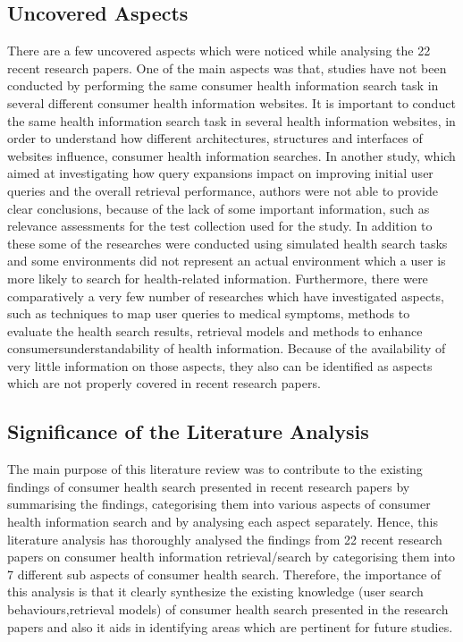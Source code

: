 \documentclass[]{article}
\begin{document}
\subsection{Uncovered Aspects} 

There are a few uncovered aspects which were noticed while analysing the 22 recent research papers. One of the main aspects was that, studies have not been conducted by performing the same consumer health information search task in several different consumer health information websites. It is important to conduct the same health information search task in several health information websites, in order to understand how different architectures, structures and interfaces of websites influence, consumer health information searches. In another study, which aimed at investigating how query expansions impact on improving initial user queries and the overall retrieval performance, authors were not able to provide clear conclusions, because of the lack of some important information, such as relevance assessments for the test collection used for the study. In addition to these some of the researches were conducted using simulated health search tasks and some environments did not represent an actual environment which a user is more likely to search for health-related information. Furthermore, there were comparatively a very few number of researches which have investigated aspects, such as techniques to map user queries to medical symptoms, methods to evaluate the health search results, retrieval models and methods to enhance consumers\textquotesingle understandability of health information. Because of the availability of very little information on those aspects, they also can be identified as aspects which are not properly covered in recent research papers.     


\subsection{Significance of the Literature Analysis}

The main purpose of this literature review was to contribute to the existing findings of consumer health search presented in recent research papers by summarising the findings, categorising them into various aspects of consumer health information search and by analysing each aspect separately. Hence, this literature analysis has thoroughly analysed the findings from 22 recent research papers on consumer health information retrieval/search by categorising them into 7 different sub aspects of consumer health search. Therefore, the importance of this analysis is that it clearly synthesize the existing knowledge (user search behaviours,retrieval models) of consumer health search presented in the research papers and also it aids in identifying areas which are pertinent for future studies. \\
\end{document}
